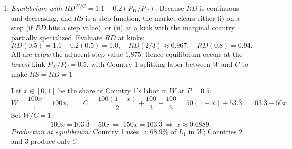 \documentclass[11pt]{article}
\begin{document}
\begin{enumerate}[leftmargin=*, resume]
\begin{enumerate}
\item \emph{Equilibrium with $RD^{W/C}=1.1-0.2(P_W/P_C)$.}
Because $RD$ is continuous and decreasing, and $RS$ is a step function, the market clears either (i) on a step (if $RD$ hits a step value), or (ii) at a kink with the marginal country partially specialized. Evaluate $RD$ at kinks:
\[
RD(0.5)=1.1-0.2(0.5)=1.0,\quad RD(2/3)\approx 0.967,\quad RD(0.8)=0.94.
\]
All are \emph{below} the adjacent step value $1.875$. Hence equilibrium occurs at the \emph{lowest} kink $P_W/P_C=0.5$, with Country 1 splitting labor between $W$ and $C$ to make $RS=RD=1$.

Let $x\in[0,1]$ be the share of Country 1's labor in $W$ at $P=0.5$.
\[
W=\frac{100x}{1}=100x,
\qquad
C=\frac{100(1-x)}{2}+\frac{100}{3}+\frac{100}{5}=50(1-x)+53.\overline{3}=103.\overline{3}-50x.
\]
Set $W/C=1$:
\[
100x=103.\overline{3}-50x \ \Rightarrow\ 150x=103.\overline{3}\ \Rightarrow\ x\approx 0.6889.
\]
\emph{Production at equilibrium:} Country 1 uses $\approx 68.9\%$ of $L_1$ in $W$; Countries 2 and 3 produce only $C$.
\end{enumerate}

\end{enumerate}
\end{document}
